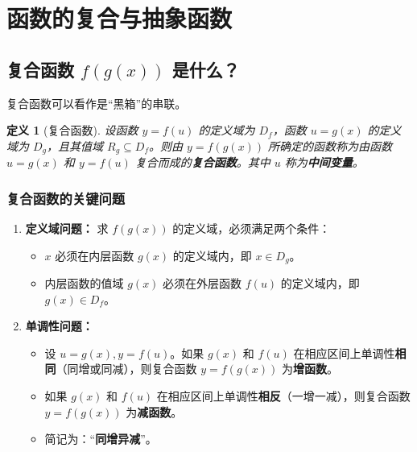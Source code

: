 \documentclass[a4paper,12pt]{ctexart}
\theoremstyle{mytheoremstyle}
\newtheorem{definition}{定义}[section]
\begin{document}
\section{函数的复合与抽象函数}

\subsection{复合函数 $f(g(x))$ 是什么？}

复合函数可以看作是“黑箱”的串联。

\begin{definition}[复合函数]
    设函数 $y=f(u)$ 的定义域为 $D_f$，函数 $u=g(x)$ 的定义域为 $D_g$，且其值域 $R_g \subseteq D_f$。则由 $y=f(g(x))$ 所确定的函数称为由函数 $u=g(x)$ 和 $y=f(u)$ 复合而成的\textbf{复合函数}。其中 $u$ 称为\textbf{中间变量}。
\end{definition}

\begin{center}
\end{center}

\subsubsection{复合函数的关键问题}
\begin{enumerate}
    \item \textbf{定义域问题：} 求 $f(g(x))$ 的定义域，必须满足两个条件：
    \begin{itemize}
        \item $x$ 必须在内层函数 $g(x)$ 的定义域内，即 $x \in D_g$。
        \item 内层函数的值域 $g(x)$ 必须在外层函数 $f(u)$ 的定义域内，即 $g(x) \in D_f$。
    \end{itemize}
    \item \textbf{单调性问题：}
    \begin{itemize}
        \item 设 $u=g(x), y=f(u)$。如果 $g(x)$ 和 $f(u)$ 在相应区间上单调性\textbf{相同}（同增或同减），则复合函数 $y=f(g(x))$ 为\textbf{增函数}。
        \item 如果 $g(x)$ 和 $f(u)$ 在相应区间上单调性\textbf{相反}（一增一减），则复合函数 $y=f(g(x))$ 为\textbf{减函数}。
        \item 简记为：“\textbf{同增异减}”。
    \end{itemize}
\end{enumerate}
\end{document}

